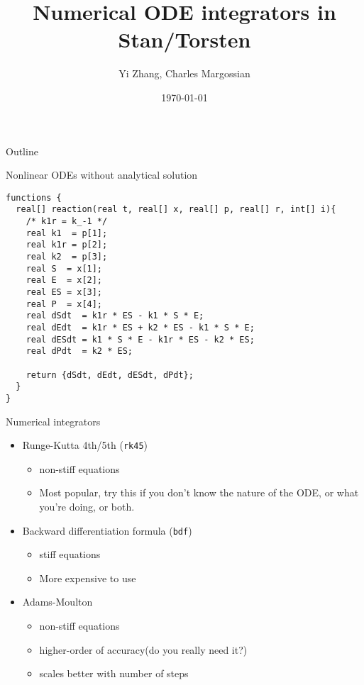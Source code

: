 \documentclass[presentation]{beamer}
\author{Yi Zhang, Charles Margossian}
\date{\today}
\title{Numerical ODE integrators in Stan/Torsten}
\begin{document}
\maketitle
\begin{frame}{Outline}
\tableofcontents
\end{frame}


\begin{frame}[fragile,label={sec:org0af9f21}]{Nonlinear ODEs without analytical solution}
 \begin{verbatim}
functions {
  real[] reaction(real t, real[] x, real[] p, real[] r, int[] i){
    /* k1r = k_-1 */
    real k1  = p[1];
    real k1r = p[2];
    real k2  = p[3];
    real S  = x[1];
    real E  = x[2];
    real ES = x[3];
    real P  = x[4];
    real dSdt  = k1r * ES - k1 * S * E;
    real dEdt  = k1r * ES + k2 * ES - k1 * S * E;
    real dESdt = k1 * S * E - k1r * ES - k2 * ES;
    real dPdt  = k2 * ES;

    return {dSdt, dEdt, dESdt, dPdt};
  }
}
\end{verbatim}
\end{frame}

\begin{frame}[fragile,label={sec:org3affb55}]{Numerical integrators}
 \begin{itemize}
\item Runge-Kutta 4th/5th (\texttt{rk45})
\begin{itemize}
\item non-stiff equations
\item Most popular, try this if you don't know the nature of the ODE, or what you're doing, or both.
\end{itemize}
\item Backward differentiation formula (\texttt{bdf})
\begin{itemize}
\item stiff equations
\item More expensive to use
\end{itemize}
\item Adams-Moulton
\begin{itemize}
\item non-stiff equations
\item higher-order of accuracy(do you really need it?)
\item scales better with number of steps
\end{itemize}
\end{itemize}
\end{frame}
\end{document}
